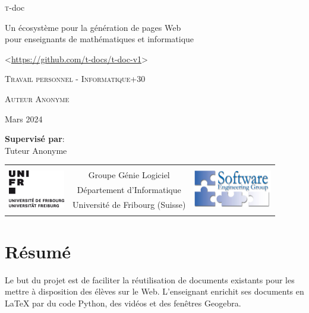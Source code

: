 \documentclass[12pt,titlepage,oneside]{article}
\newcommand{\authorname}{Caroline Blank}
\newcommand{\tutorname}{Prof. Dr. Jacques Pasquier\\
Software Engineering Group\\}
\newcommand{\titlename}{t-doc}
\newcommand{\subtitlename}{Un écosystème pour la génération de pages Web\\ pour enseignants de mathématiques et informatique}
\newcommand{\worktype}{Travail personnel - Informatique+30}
\newcommand{\workdate}{Mars 2024}
\newcommand{\supervisorslabel}{Supervisé par}
\renewcommand{\authorname}{Auteur Anonyme}
\renewcommand{\tutorname}{Tuteur Anonyme}
\newcommand{\titlepagefooter}{
\begin{tabular}{lcr} \hline
\multirow{5}{*}{\includegraphics[height=1.65cm]{unifr_logo}} &  & \multirow{5}{*}{\includegraphics[height=1.65cm]{softeng}} \\
& Groupe Génie Logiciel &  \\
& Département d'Informatique &  \\
& Université de Fribourg (Suisse) &  \\
& & \\
\end{tabular}
}
\begin{document}
\begin{titlepage}
\begin{center}

  \vspace*{0.3cm}
  \begin{huge}
    \textsc\titlename \\
  \end{huge}
  \vspace{0.4cm}
  \begin{Large}
  \subtitlename
  \end{Large}
  \par

  \vspace{0.5cm}
  <\url{https://github.com/t-docs/t-doc-v1}>



  \vspace*{2cm}

  \begin{normalsize}
  \textsc{\worktype}
  \end{normalsize}

  \vspace*{1.5cm}
  \begin{LARGE}
  \textsc{\authorname}\\
      \vspace{0.2cm}
  \end{LARGE}
  \begin{large}
    {\workdate}
  \end{large}

  \vspace*{3cm}

  \textbf{\supervisorslabel}:\\
  \vspace{0.2cm}
  \tutorname
  \vspace*{2cm}

  \titlepagefooter


\end{center}
\end{titlepage}

\section*{Résumé}
Le but du projet est de faciliter la réutilisation de documents existants pour les mettre à disposition des élèves sur le Web. L'enseignant enrichit ses documents en LaTeX par du code Python, des vidéos et des fenêtres Geogebra.
\end{document}
